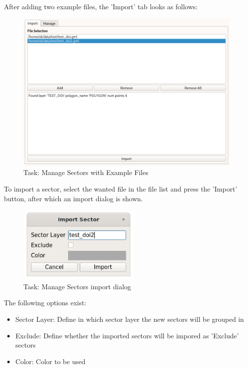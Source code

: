 After adding two example files, the 'Import' tab looks as follows:

\begin{figure}[H]
    \includegraphics[width=16cm,frame]{figures/manage_sectors_ready.png}
  \caption{Task: Manage Sectors with Example Files}
\end{figure}

To import a sector, select the wanted file in the file list and press the 'Import' button, after which an import dialog is shown. \\

\begin{figure}[H]
    \includegraphics[width=6cm]{figures/manage_sectors_import_dialog.png}
  \caption{Task: Manage Sectors import dialog}
\end{figure}

The following options exist:
\begin{itemize}  
\item Sector Layer: Define in which sector layer the new sectors will be grouped in
\item Exclude: Define whether the imported sectors will be impored as 'Exclude' sectors
\item Color: Color to be used
\end{itemize}
\ \\

